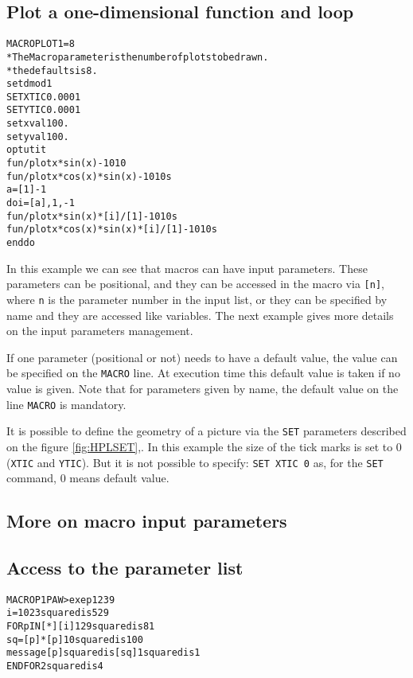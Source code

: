 \subsection{Plot a one-dimensional function and loop}
\begin{alltt}
   MACRO PLOT  1=8
      * The Macro parameter is the number of plots to be drawn.
      * the defaults is 8.
      set dmod 1
     SET XTIC 0.0001
     SET YTIC 0.0001
      set xval 100.
      set yval 100.
      opt utit
      fun/plot x*sin(x) -10 10
      fun/plot x*cos(x)*sin(x) -10 10 s
      a=[1]-1
      do i=[a],1,-1
        fun/plot x*sin(x)*[i]/[1] -10 10 s
        fun/plot x*cos(x)*sin(x)*[i]/[1] -10 10 s
      enddo
\end{alltt} 
\begin{DinglistE}
\item In this example we can see that macros can have input parameters.
      These parameters can be positional, and they can be
      accessed in the macro via {\tt [n]}, where {\tt n} is the parameter
      number in the input list, or they can be specified by name and they 
      are accessed like variables. The next example gives more details on
      the input parameters management.
\item If one parameter (positional or not) needs to have a default value,
      the value can be specified on the {\tt MACRO} line. At execution time this
      default value is taken if no value is given. Note that for parameters
      given by name, the default value on the line {\tt MACRO} is mandatory.
\item It is possible to define the geometry of a picture via the {\tt SET}
      parameters described on the figure \ref{fig:HPLSET},. In this example
      the size of the tick marks is set to 0 ({\tt XTIC} and {\tt YTIC}).
      But it is not possible to specify: {\tt SET XTIC 0} as, for the
      {\tt SET} command, 0 means default value.
\end{DinglistE}

\clearpage

\subsection{More on macro input parameters}

\subsection*{Access to the parameter list}
\begin{alltt}
  MACRO P1                                          PAW > exe p1 23 9
  i = 10                                                  23 squared is 529
 FOR p IN [*] [i] 1 2                                    9 squared is 81
    sq = [p] * [p]                                        10 squared is 100
    message [p] squared is [sq]                           1 squared is 1
  ENDFOR                                                  2 squared is 4
\end{alltt}

